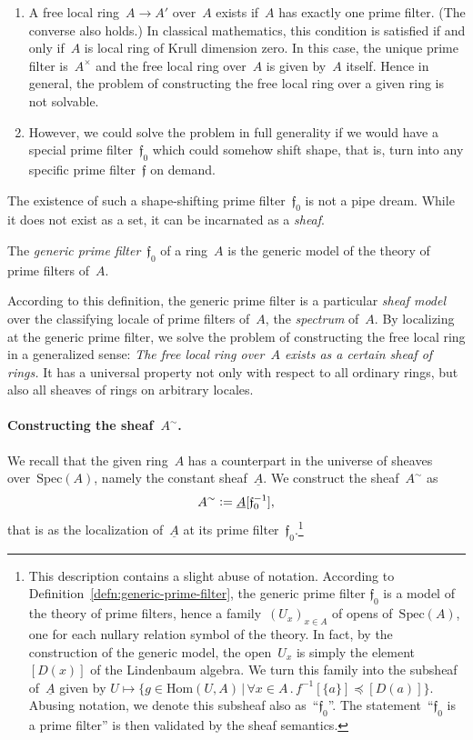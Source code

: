 \documentclass{ws-rv9x6}
\newcommand{\fff}{\mathfrak{f}}
\newcommand{\defeq}{\vcentcolon=}
\newcommand{\Hom}{\mathrm{Hom}}
\newcommand{\Spec}{\mathrm{Spec}}
\renewcommand{\_}{\mathpunct{.}}
\newcommand{\?}{\,{:}\,}
\begin{document}
\begin{enumerate}
\item A free local ring~$A \to A'$ over~$A$ exists if~$A$ has exactly one prime
filter. (The converse also holds.) In classical mathematics, this condition is
satisfied if and only if~$A$ is local ring of Krull dimension zero. In this
case, the unique prime filter is~$A^\times$ and the free local ring over~$A$ is given
by~$A$ itself. Hence in general, the problem of constructing the free local
ring over a given ring is not solvable.
\item However, we could solve the problem in full generality if we would have a
special prime filter~$\fff_0$ which could somehow shift shape, that is, turn into any
specific prime filter~$\fff$ on demand.
\end{enumerate}

The existence of such a shape-shifting prime filter~$\fff_0$ is not a pipe dream.
While it does not exist as a set, it can be incarnated as a \emph{sheaf}.

\begin{definition}\label{defn:generic-prime-filter}
The \emph{generic prime filter}~$\fff_0$ of a ring~$A$ is the
generic model of the theory of prime filters of~$A$.\end{definition}

According to this definition, the generic prime filter is a particular
\emph{sheaf model} over the classifying locale of prime filters of~$A$, the
\emph{spectrum} of~$A$. By localizing at the generic prime filter, we solve
the problem of constructing the free local ring in a generalized sense: \emph{The
free local ring over~$A$ exists as a certain sheaf of rings.} It has a
universal property not only with respect to all ordinary rings, but also all
sheaves of rings on arbitrary locales.

\paragraph{Constructing the sheaf~$A^\sim$.} We recall that the given ring~$A$
has a counterpart in the universe of sheaves over~$\Spec(A)$, namely the
constant sheaf~$\underline{A}$. We construct the sheaf~$A^\sim$ as
\[ A^\sim \defeq \underline{A}[\fff_0^{-1}], \]
that is as the localization of~$\underline{A}$ at its prime
filter~$\fff_0$.\footnote{This description contains a slight abuse of notation.
According to Definition~\ref{defn:generic-prime-filter}, the generic prime
filter $\fff_0$ is a model of the theory of prime filters, hence a
family~$(U_x)_{x \in A}$ of opens of~$\Spec(A)$, one for each nullary relation
symbol of the theory. In fact, by the construction of the generic model, the
open~$U_x$ is simply the element~$[D(x)]$ of the Lindenbaum algebra. We
turn this family into the subsheaf of~$\underline{A}$ given by $U \mapsto \{ g
\in \Hom(U,A) \,|\, \forall x \in A\_ f^{-1}[\{a\}] \preceq [D(a)] \}$. Abusing
notation, we denote this subsheaf also as~``$\fff_0$''. The
statement~``$\fff_0$ is a prime filter'' is then validated by the sheaf semantics.}
\end{document}
